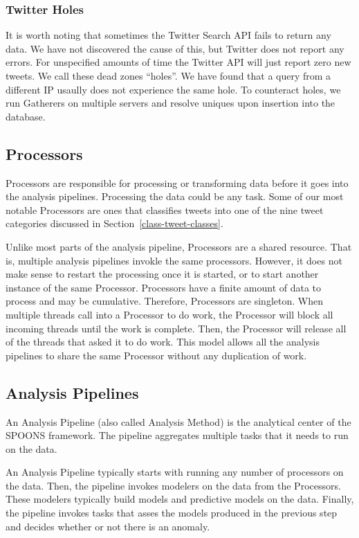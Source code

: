 \documentclass[12pt]{ucthesis}
\begin{document}
\subsubsection{Twitter Holes}
\label{arch-twitter-holes}
It is worth noting that sometimes the Twitter Search API fails to return any data. We have not discovered the cause
of this, but Twitter does not report any errors. For unspecified amounts of time the Twitter API will just report zero
new tweets. We call these dead zones ``holes''. We have found that a query from a different IP usaully does not
experience the same hole. To counteract holes, we run Gatherers on multiple servers and resolve uniques upon insertion
into the database.

\subsection{Processors}
\label{arch-processors}
Processors are responsible for processing or transforming data before it goes into the analysis pipelines.
Processing the data could be any task. Some of our most notable Processors are ones that classifies tweets into one of
the nine tweet categories discussed in Section~\ref{class-tweet-classes}.

Unlike most parts of the analysis pipeline, Processors are a shared resource. That is, multiple analysis pipelines
invokle the same processors. However, it does not make sense to restart the processing once it is started, or to
start another instance of the same Processor. Processors have a finite amount of data to process and may be cumulative.
Therefore, Processors are singleton. When multiple threads call into a Processor to do work, the Processor will block
all incoming threads until the work is complete. Then, the Processor will release all of the threads that asked it to
do work. This model allows all the analysis pipelines to share the same Processor without any duplication of work.

\subsection{Analysis Pipelines}
\label{arch-pipelines}
An Analysis Pipeline (also called Analysis Method) is the analytical center of the SPOONS framework.
The pipeline aggregates multiple tasks that it needs to run on the data.

An Analysis Pipeline typically starts with running any number of processors on the data.
Then, the pipeline invokes modelers on the data from the Processors. These modelers typically build models and
predictive models on the data. Finally, the pipeline invokes tasks that asses the models produced in the previous
step and decides whether or not there is an anomaly.
\end{document}
